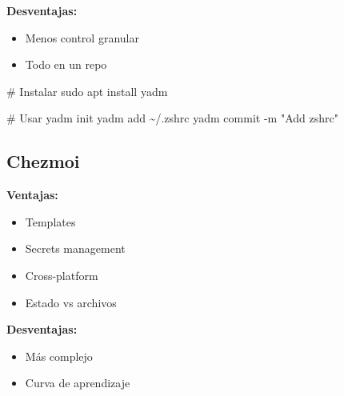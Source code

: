 \documentclass[
  doc,
  floatsintext,
  longtable,
  a4paper,
  nolmodern,
  notxfonts,
  notimes,
  12pt,
  colorlinks=true,linkcolor=blue,citecolor=blue,urlcolor=blue]{apa7}
\newenvironment{Shaded}{\begin{snugshade}}{\end{snugshade}}
\newcommand{\AttributeTok}[1]{\textcolor[rgb]{0.40,0.45,0.13}{#1}}
\newcommand{\CommentTok}[1]{\textcolor[rgb]{0.37,0.37,0.37}{#1}}
\newcommand{\ExtensionTok}[1]{\textcolor[rgb]{0.00,0.23,0.31}{#1}}
\newcommand{\FunctionTok}[1]{\textcolor[rgb]{0.28,0.35,0.67}{#1}}
\newcommand{\NormalTok}[1]{\textcolor[rgb]{0.00,0.23,0.31}{#1}}
\newcommand{\StringTok}[1]{\textcolor[rgb]{0.13,0.47,0.30}{#1}}
\newcommand{\VariableTok}[1]{\textcolor[rgb]{0.07,0.07,0.07}{#1}}
\providecommand{\tightlist}{%
  \setlength{\itemsep}{0pt}\setlength{\parskip}{0pt}}
\begin{document}
\textbf{Desventajas:}

\begin{itemize}
\tightlist
\item
  Menos control granular
\item
  Todo en un repo
\end{itemize}

\begin{Shaded}
\begin{Highlighting}[]
\CommentTok{\# Instalar}
\FunctionTok{sudo}\NormalTok{ apt install yadm}

\CommentTok{\# Usar}
\ExtensionTok{yadm}\NormalTok{ init}
\ExtensionTok{yadm}\NormalTok{ add \textasciitilde{}/.zshrc}
\ExtensionTok{yadm}\NormalTok{ commit }\AttributeTok{{-}m} \StringTok{"Add zshrc"}
\end{Highlighting}
\end{Shaded}

\subsection{Chezmoi}\label{chezmoi}

\textbf{Ventajas:}

\begin{itemize}
\tightlist
\item
  Templates
\item
  Secrets management
\item
  Cross-platform
\item
  Estado vs archivos
\end{itemize}

\textbf{Desventajas:}

\begin{itemize}
\tightlist
\item
  Más complejo
\item
  Curva de aprendizaje
\end{itemize}

\begin{Shaded}
\end{Shaded}
\end{document}
